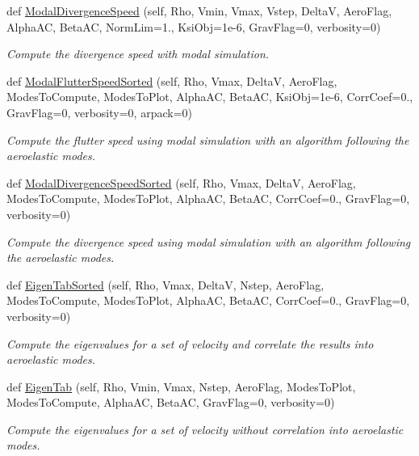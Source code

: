 \begin{DoxyCompactItemize}
def \hyperlink{classgebtaero_1_1_simulation_1_1_simulation_ac3bea60a9f9d2c552125644a3256df88}{Modal\+Divergence\+Speed} (self, Rho, Vmin, Vmax, Vstep, DeltaV, Aero\+Flag, Alpha\+AC, Beta\+AC, Norm\+Lim=1., Ksi\+Obj=1e-\/6, Grav\+Flag=0, verbosity=0)
\begin{DoxyCompactList}\small\item\em Compute the divergence speed with modal simulation. \end{DoxyCompactList}\item 
def \hyperlink{classgebtaero_1_1_simulation_1_1_simulation_ae06bc82e983fb16d7f3e303046a39a2e}{Modal\+Flutter\+Speed\+Sorted} (self, Rho, Vmax, DeltaV, Aero\+Flag, Modes\+To\+Compute, Modes\+To\+Plot, Alpha\+AC, Beta\+AC, Ksi\+Obj=1e-\/6, Corr\+Coef=0., Grav\+Flag=0, verbosity=0, arpack=0)
\begin{DoxyCompactList}\small\item\em Compute the flutter speed using modal simulation with an algorithm following the aeroelastic modes. \end{DoxyCompactList}\item 
def \hyperlink{classgebtaero_1_1_simulation_1_1_simulation_a597d75e677892bd4308a6537a27eedb8}{Modal\+Divergence\+Speed\+Sorted} (self, Rho, Vmax, DeltaV, Aero\+Flag, Modes\+To\+Compute, Modes\+To\+Plot, Alpha\+AC, Beta\+AC, Corr\+Coef=0., Grav\+Flag=0, verbosity=0)
\begin{DoxyCompactList}\small\item\em Compute the divergence speed using modal simulation with an algorithm following the aeroelastic modes. \end{DoxyCompactList}\item 
def \hyperlink{classgebtaero_1_1_simulation_1_1_simulation_ae64bf3c9cef715d9d999acef888a840e}{Eigen\+Tab\+Sorted} (self, Rho, Vmax, DeltaV, Nstep, Aero\+Flag, Modes\+To\+Compute, Modes\+To\+Plot, Alpha\+AC, Beta\+AC, Corr\+Coef=0., Grav\+Flag=0, verbosity=0)
\begin{DoxyCompactList}\small\item\em Compute the eigenvalues for a set of velocity and correlate the results into aeroelastic modes. \end{DoxyCompactList}\item 
def \hyperlink{classgebtaero_1_1_simulation_1_1_simulation_a2907ad4a52664321ef36ca2d05a5ea64}{Eigen\+Tab} (self, Rho, Vmin, Vmax, Nstep, Aero\+Flag, Modes\+To\+Plot, Modes\+To\+Compute, Alpha\+AC, Beta\+AC, Grav\+Flag=0, verbosity=0)
\begin{DoxyCompactList}\small\item\em Compute the eigenvalues for a set of velocity without correlation into aeroelastic modes. \end{DoxyCompactList}\item 

\end{DoxyCompactItemize}

